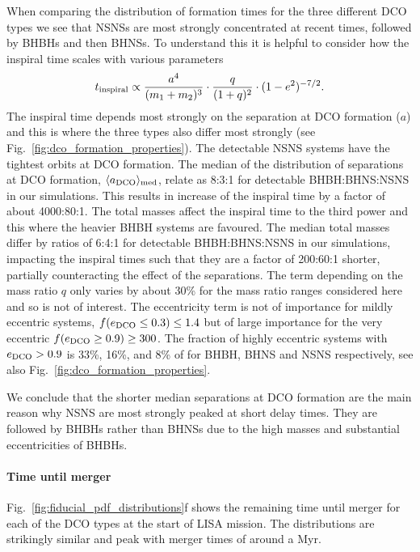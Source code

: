 When comparing the distribution of formation times for the three different DCO types we see that NSNSs are most strongly concentrated at recent times, followed by BHBHs and then BHNSs. To understand this it is helpful to consider how the inspiral time scales with various parameters \citep{Peters+1964}
\begin{equation}
    t_{\rm inspiral} \propto \frac{a^4}{(m_1 + m_2)^{3}} \cdot \frac{q}{(1+q)^2} \cdot (1 - e^2)^{-7/2}.
\end{equation}
The inspiral time depends most strongly on the separation at DCO formation ($a$) and this is where the three types also differ most strongly (see Fig.~\ref{fig:dco_formation_properties}). The detectable NSNS systems have the tightest orbits at DCO formation. The median of the distribution of separations at DCO formation, $\langle a_{\rm DCO} \rangle_{\rm med}$, relate as 8:3:1 for detectable BHBH:BHNS:NSNS in our simulations. This results in increase of the inspiral time by a factor of about 4000:80:1. The total masses affect the inspiral time to the third power and this where the heavier BHBH systems are favoured. The median total masses differ by ratios of 6:4:1 for detectable BHBH:BHNS:NSNS in our simulations, impacting the inspiral times such that they are a factor of 200:60:1 shorter, partially counteracting the effect of the separations. The term depending on the mass ratio $q$ only varies by about 30\% for the mass ratio ranges considered here and so is not of interest. The eccentricity term is not of importance for mildly eccentric systems, $f(e_{\rm DCO} \le 0.3)  \le 1.4$ but of large importance for the very eccentric  $f(e_{\rm DCO} \ge 0.9) \ge 300$. The fraction of highly eccentric systems with $e_{\rm DCO}>0.9$ is 33\%, 16\%, and 8\% of for BHBH, BHNS and NSNS respectively, see also Fig.~\ref{fig:dco_formation_properties}. 

We conclude that the shorter median separations at DCO formation are the main reason why NSNS are most strongly peaked at short delay times. They are followed by BHBHs rather than BHNSs due to the high masses and substantial eccentricities of BHBHs.

\paragraph{Time until merger} Fig.~\ref{fig:fiducial_pdf_distributions}f shows the remaining time until merger for each of the DCO types at the start of LISA mission. The distributions are strikingly similar and peak with merger times of around a Myr.

